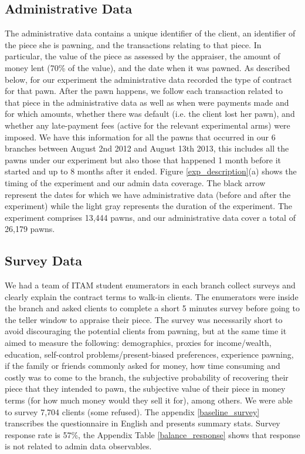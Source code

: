 \documentclass[11pt]{article}
\begin{document}
\subsection{Administrative Data}
The administrative data contains a unique identifier of the client, an identifier of the piece she is pawning, and the transactions relating to that piece. In particular, the value of the piece as assessed by the appraiser, the amount of money lent (70\% of the value), and the date when it was pawned. As described below, for our experiment the administrative data recorded the type of contract for that pawn. After the pawn happens, we follow each transaction related to that piece in the administrative data as well as when were payments made and for which amounts, whether there was default (i.e. the client lost her pawn), and whether any late-payment fees (active for the relevant experimental arms) were imposed. We have this information for all the pawns that occurred in our 6 branches between August 2nd 2012 and August 13th 2013, this includes all the pawns under our experiment but also those that happened 1 month before it started and up to 8 months after it ended. Figure \ref{exp_description}(a) shows the timing of the experiment and our admin data coverage. The black arrow represent the dates for which we have administrative data (before and after the experiment) while the light gray represents the duration of the experiment. The experiment comprises 13,444 pawns, and our administrative data cover a total of 26,179 pawns.

\subsection{Survey Data} 

We had a team of ITAM student enumerators in each branch collect surveys and clearly explain the contract terms to walk-in clients. The enumerators were inside the branch and asked clients to complete a short 5 minutes survey before going to the teller window to appraise their piece. The survey was necessarily short to avoid discouraging the potential clients from pawning, but at the same time it aimed to measure the following: demographics, proxies for income/wealth, education, self-control problems/present-biased preferences, experience pawning, if the family or friends commonly asked for money, how time consuming and costly was to come to the branch, the subjective probability of recovering their piece that they intended to pawn, the subjective value of their piece in money terms (for how much money would they sell it for), among others. We were able to survey 7,704 clients (some refused). %
The appendix \ref{baseline_survey} transcribes the questionnaire in English and presents summary stats. Survey response rate is 57\%, the Appendix Table \ref{balance_response} shows that response is not related to admin data observables.
\end{document}
